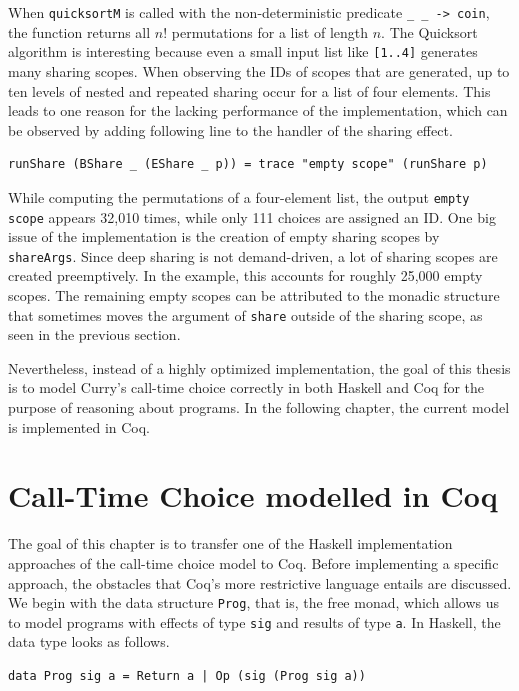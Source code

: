\documentclass[a4paper, 11pt, fleqn, twoside]{scrreprt}
\newcommand{\hinl}[1]{\texttt{#1}}
\begin{document}
When \hinl{quicksortM} is called with the non-deterministic predicate \hinl{\_ _ -> coin}, the function returns all $n!$ permutations for a list of length $n$.
The Quicksort algorithm is interesting because even a small input list like \hinl{[1..4]} generates many sharing scopes.
When observing the IDs of scopes that are generated, up to ten levels of nested and repeated sharing occur for a list of four elements.
This leads to one reason for the lacking performance of the implementation, which can be observed by adding following line to the handler of the sharing effect.

\begin{verbatim}
runShare (BShare _ (EShare _ p)) = trace "empty scope" (runShare p)
\end{verbatim}

While computing the permutations of a four-element list, the output \hinl{empty scope} appears 32,010 times, while only 111 choices are assigned an ID.
One big issue of the implementation is the creation of empty sharing scopes by \hinl{shareArgs}.
Since deep sharing is not demand-driven, a lot of sharing scopes are created preemptively.
In the example, this accounts for roughly 25,000 empty scopes.
The remaining empty scopes can be attributed to the monadic structure that sometimes moves the argument of \hinl{share} outside of the sharing scope, as seen in the previous section.

Nevertheless, instead of a highly optimized implementation, the goal of this thesis is to model Curry's call-time choice correctly in both Haskell and Coq for the purpose of reasoning about programs.
In the following chapter, the current model is implemented in Coq.



\chapter{Call-Time Choice modelled in Coq}
\label{ch:callTimeChoiceCoq}
The goal of this chapter is to transfer one of the  Haskell implementation approaches of the call-time choice model to Coq.
Before implementing a specific approach, the obstacles that Coq's more restrictive language entails are discussed.
We begin with the data structure \hinl{Prog}, that is, the free monad, which allows us to model programs with effects of type \hinl{sig} and results of type \hinl{a}.
In Haskell, the data type looks as follows.

\begin{verbatim}
data Prog sig a = Return a | Op (sig (Prog sig a))
\end{verbatim}
\end{document}
